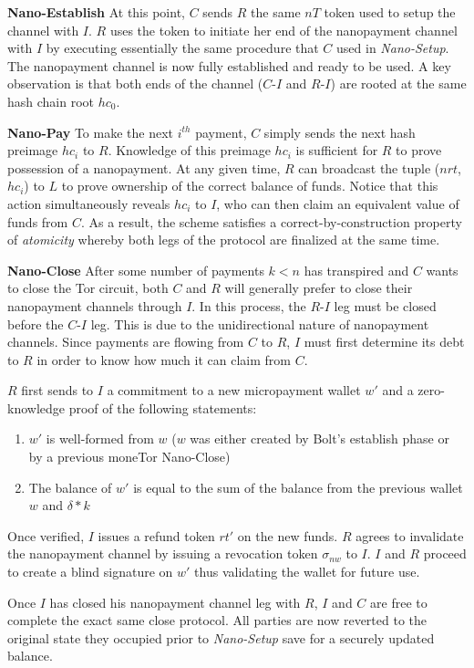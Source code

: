 \textbf{Nano-Establish} At this point, $C$ sends $R$ the same $nT$ token used to
setup the channel with $I$. $R$ uses the token to initiate her end of the
nanopayment channel with $I$ by executing essentially the same procedure that
$C$ used in \emph{Nano-Setup}. The nanopayment channel is now fully established
and ready to be used. A key observation is that both ends of the channel
($C$-$I$ and $R$-$I$) are rooted at the same hash chain root $hc_0$.

\textbf{Nano-Pay} To make the next $i^{th}$ payment, $C$ simply sends the next
hash preimage $hc_i$ to $R$. Knowledge of this preimage $hc_i$ is sufficient for
$R$ to prove possession of a nanopayment. At any given time, $R$ can broadcast
the tuple ($nrt$, $hc_i$) to $L$ to prove ownership of the correct balance of
funds. Notice that this action simultaneously reveals $hc_i$ to $I$, who can
then claim an equivalent value of funds from $C$. As a result, the scheme
satisfies a correct-by-construction property of \emph{atomicity} whereby both
legs of the protocol are finalized at the same time.

\textbf{Nano-Close} After some number of payments $k < n$ has transpired and $C$
wants to close the Tor circuit, both $C$ and $R$ will generally prefer to close
their nanopayment channels through $I$. In this process, the $R$-$I$ leg must be
closed before the $C$-$I$ leg. This is due to the unidirectional nature of
nanopayment channels. Since payments are flowing from $C$ to $R$, $I$ must first
determine its debt to $R$ in order to know how much it can claim from $C$.

$R$ first sends to $I$ a commitment to a new micropayment wallet $w'$ and a
zero-knowledge proof of the following statements:

\begin{enumerate}
\item $w'$ is well-formed from $w$ ($w$ was either created by Bolt's establish
  phase or by a previous moneTor Nano-Close)
\item The balance of $w'$ is equal to the sum of the balance from the previous
  wallet $w$ and $\delta * k$
\end{enumerate}

Once verified, $I$ issues a refund token $rt'$ on the new funds. $R$ agrees to
invalidate the nanopayment channel by issuing a revocation token $\sigma_{nw}$
to $I$. $I$ and $R$ proceed to create a blind signature on $w'$ thus validating
the wallet for future use.

Once $I$ has closed his nanopayment channel leg with $R$, $I$ and $C$ are free
to complete the exact same close protocol. All parties are now reverted to the
original state they occupied prior to \emph{Nano-Setup} save for a securely
updated balance.


